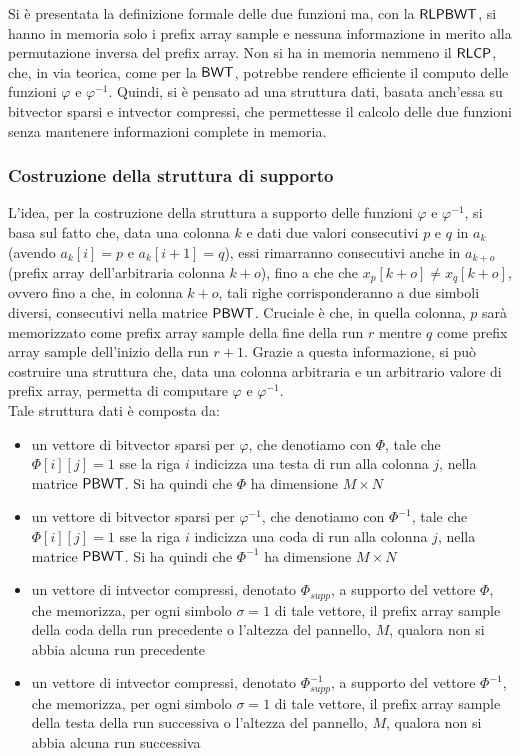 \noindent
Si è presentata la definizione formale delle due funzioni ma, con la $\mbox{\rm {\sf RLPBWT}}$,
si hanno in memoria solo i prefix array sample  e nessuna informazione in merito
alla permutazione inversa del 
prefix array. Non si ha in memoria nemmeno il $\mbox{\rm {\sf RLCP}}$, che, in via teorica, come
per la $\mbox{\rm {\sf BWT}}$, potrebbe rendere efficiente il computo delle funzioni $\varphi$
e $\varphi^{-1}$. Quindi, si è pensato ad una struttura dati, basata
anch'essa su bitvector sparsi e intvector compressi, che permettesse il calcolo
delle due funzioni senza mantenere informazioni complete in memoria. 
\subsubsection{Costruzione della struttura di supporto}
L'idea, per la costruzione della struttura a supporto delle
funzioni $\varphi$ e $\varphi^{-1}$, si
basa sul fatto che, data una colonna $k$ e dati due valori consecutivi $p$ e $q$
in $a_k$ (avendo $a_k[i]=p$ e $a_k[i+1]=q$), essi rimarranno consecutivi anche
in $a_{k+o}$ (prefix array dell'arbitraria colonna $k+o$), fino a che
che $x_{p}[k+o]\neq x_{q}[k+o]$, ovvero fino a che, in colonna $k+o$, tali righe
corrisponderanno a due simboli diversi, consecutivi nella matrice
$\mbox{\rm {\sf PBWT}}$. Cruciale è che, in quella colonna, 
$p$ sarà memorizzato come prefix array sample della fine della run $r$
mentre $q$ come prefix array sample dell'inizio della run $r+1$. Grazie
a questa informazione, si può costruire una struttura che, data una colonna
arbitraria e un arbitrario valore di prefix array, permetta di
computare $\varphi$ e $\varphi^{-1}$.\\
Tale struttura dati è composta da:
\begin{itemize}
  \item un vettore di bitvector sparsi per $\varphi$, che denotiamo con
  $\varPhi$, tale che $\varPhi[i][j]=1$ sse la riga $i$ indicizza una testa di
  run alla colonna $j$, nella matrice $\mbox{\rm {\sf PBWT}}$. Si ha quindi che $\varPhi$
  ha dimensione $M\times N$
  \item un vettore di bitvector sparsi per $\varphi^{-1}$, che
  denotiamo con $\varPhi^{-1}$, tale che $\varPhi[i][j]=1$ sse la riga $i$
  indicizza una coda di run alla colonna $j$, nella matrice $\mbox{\rm {\sf PBWT}}$. Si ha
  quindi che $\varPhi^{-1}$ ha dimensione $M\times N$
  \item un vettore di intvector compressi, denotato $\varPhi_{supp}$, a supporto
  del vettore $\varPhi$, che memorizza, per ogni simbolo $\sigma=1$ di tale
  vettore, il 
  prefix array sample della coda della run precedente o l'altezza
  del pannello, $M$, qualora non si abbia alcuna run precedente
  \item un vettore di intvector compressi, denotato $\varPhi^{-1}_{supp}$,
  a supporto del vettore $\varPhi^{-1}$, che memorizza, per ogni simbolo
  $\sigma=1$
  di tale vettore,
  il prefix array sample della testa della run successiva o l'altezza
  del pannello, $M$, qualora non si abbia alcuna run successiva
\end{itemize}

